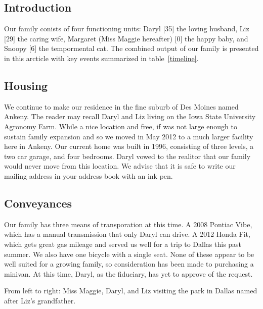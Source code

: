 \documentclass{article}
\makeatletter
\newenvironment{figurehere}
  {\def\@captype{figure}}
  {}
\makeatother
\begin{document}
\begin{multicols}{2}

\section{Introduction}
Our family conists of four functioning units:  Daryl [35] the loving
husband, Liz [29] the caring wife, Margaret (Miss Maggie hereafter) [0] 
the happy baby, and Snoopy [6] the tempormental cat.  The combined output
of our family is presented in this arcticle with key events summarized in
table~\ref{timeline}.

\subsection{Housing}

We continue to make our residence in the fine suburb of Des Moines 
named Ankeny.  The reader may recall Daryl and Liz living on the
Iowa State University Agronomy Farm.  While a nice location and free,
if was not large enough to sustain family expansion and so we moved 
in May 2012 to a much larger facility here in Ankeny.  Our current home 
was built in 1996, consisting of three levels, a two car garage, and
four bedrooms.  Daryl vowed to the realitor that our family would never
move from this location.  We advise that it is safe to write our mailing
address in your address book with an ink pen.

\subsection{Conveyances}

Our family has three means of transporation at this time.  A 2008 Pontiac 
Vibe, which has a manual transmission that only Daryl can drive.  A 2012 
Honda Fit, which gets great gas mileage and served us well for a trip to
Dallas this past summer.  We also have one bicycle with a single seat.
None of these appear to be well suited for a growing family, so consideration
has been made to purchasing a minivan.  At this time, Daryl, as the fiduciary,
has yet to approve of the request.

\begin{figurehere}
 \centering   
 \caption{From left to right: Miss Maggie, Daryl, and Liz visiting the park
in Dallas named after Liz's grandfather.}
\end{figurehere}


\end{multicols}
\end{document}
